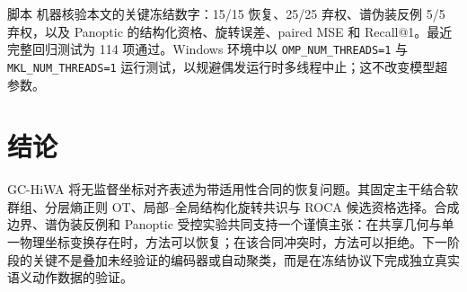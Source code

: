 \documentclass[10pt,a4paper,fontset=windows]{ctexart}
\theoremstyle{definition}
\theoremstyle{remark}
\begin{document}
脚本  机器核验本文的关键冻结数字：15/15 恢复、25/25 弃权、谱伪装反例 5/5 弃权，以及 Panoptic 的结构化资格、旋转误差、paired MSE 和 Recall@1。最近完整回归测试为 114 项通过。Windows 环境中以 \texttt{OMP\_NUM\_THREADS=1} 与 \texttt{MKL\_NUM\_THREADS=1} 运行测试，以规避偶发运行时多线程中止；这不改变模型超参数。

\section{结论}
GC-HiWA 将无监督坐标对齐表述为带适用性合同的恢复问题。其固定主干结合软群组、分层熵正则 OT、局部--全局结构化旋转共识与 ROCA 候选资格选择。合成边界、谱伪装反例和 Panoptic 受控实验共同支持一个谨慎主张：在共享几何与单一物理坐标变换存在时，方法可以恢复；在该合同冲突时，方法可以拒绝。下一阶段的关键不是叠加未经验证的编码器或自动聚类，而是在冻结协议下完成独立真实语义动作数据的验证。

\appendix
\end{document}
